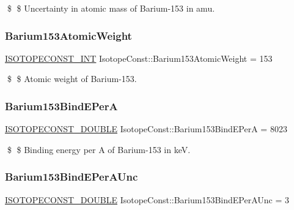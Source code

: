 \$ \$ Uncertainty in atomic mass of Barium-\/153 in amu. \mbox{\label{group___isotope_const-_barium-_ba153_ga210d3f954effda34d97bc826cd962d81}} 
\subsubsection{\texorpdfstring{Barium153\+Atomic\+Weight}{Barium153AtomicWeight}}
{\footnotesize\ttfamily \mbox{\hyperlink{group___isotope_const-_macros_ga5f18360b3e99483a35c32d789e62621c}{I\+S\+O\+T\+O\+P\+E\+C\+O\+N\+S\+T\+\_\+\+I\+NT}} Isotope\+Const\+::\+Barium153\+Atomic\+Weight = 153}

\$ \$ Atomic weight of Barium-\/153. \mbox{\label{group___isotope_const-_barium-_ba153_gabd5932ad1d304b998b72970521be0ea1}} 
\subsubsection{\texorpdfstring{Barium153\+Bind\+E\+PerA}{Barium153BindEPerA}}
{\footnotesize\ttfamily \mbox{\hyperlink{group___isotope_const-_macros_ga8f45a7272ce02c0b4c65c44636ed719a}{I\+S\+O\+T\+O\+P\+E\+C\+O\+N\+S\+T\+\_\+\+D\+O\+U\+B\+LE}} Isotope\+Const\+::\+Barium153\+Bind\+E\+PerA = 8023}

\$ \$ Binding energy per A of Barium-\/153 in keV. \mbox{\label{group___isotope_const-_barium-_ba153_ga977e43040b5ab1c8dbdb792a48f0db77}} 
\subsubsection{\texorpdfstring{Barium153\+Bind\+E\+Per\+A\+Unc}{Barium153BindEPerAUnc}}
{\footnotesize\ttfamily \mbox{\hyperlink{group___isotope_const-_macros_ga8f45a7272ce02c0b4c65c44636ed719a}{I\+S\+O\+T\+O\+P\+E\+C\+O\+N\+S\+T\+\_\+\+D\+O\+U\+B\+LE}} Isotope\+Const\+::\+Barium153\+Bind\+E\+Per\+A\+Unc = 3}

